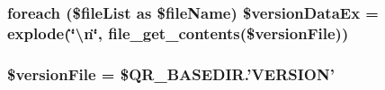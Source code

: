 \hypertarget{merge_8php_afdf5d77c1948029c7d27d6011e876a61}{
\subsubsection[{\$version\-Data\-Ex}]{\setlength{\rightskip}{0pt plus 5cm}foreach (\$file\-List as \$file\-Name) \$version\-Data\-Ex = explode(\char`\"{}\textbackslash{}n\char`\"{}, file\-\_\-get\-\_\-contents(\$version\-File))}}\label{merge_8php_afdf5d77c1948029c7d27d6011e876a61}
\hypertarget{merge_8php_a89ce9781b8ddbd4548b0bd11b2a11b30}{
\subsubsection[{\$version\-File}]{\setlength{\rightskip}{0pt plus 5cm}\$version\-File = \$Q\-R\-\_\-\-B\-A\-S\-E\-D\-I\-R.'V\-E\-R\-S\-I\-O\-N'}}\label{merge_8php_a89ce9781b8ddbd4548b0bd11b2a11b30}
